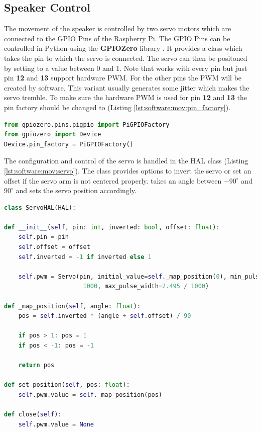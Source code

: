 \subsection{Speaker Control}

The movement of the speaker is controlled by two servo motors which are connected to the GPIO Pins of the Raspberry Pi. The GPIO Pins can be controlled in Python using the \textbf{GPIOZero} library\cite{nuttall_gpio_2021} . It provides a class  which takes the pin to which the servo is connected. The servo can then be positoned by setting  to a value between $0$ and $1$. Note that  works with every pin but just pin \textbf{12} and \textbf{13} support hardware PWM. For the other pins the PWM will be created by software. This variant usually generates some jitter which makes the servo tremble. To make sure the hardware PWM is used for pin \textbf{12} and \textbf{13} the pin factory should be changed to  (Listing \ref{lst:software:mov:pin_factory}).\cite{nuttall_gpio_2021}
%
\begin{mdframed}
\begin{lstlisting}[language=Python, caption=Changing the pin factory, label=lst:software:mov:pin_factory]
from gpiozero.pins.pigpio import PiGPIOFactory
from gpiozero import Device
Device.pin_factory = PiGPIOFactory()
\end{lstlisting}
\end{mdframed}
%
The configuration and control of the servo is handled in the HAL class  (Listing \ref{lst:software:mov:servo}). The class provides options to invert the servo or set an offset if the servo arm is not centered properly.  takes an angle between $-90^\circ$ and $90^\circ$ and sets the servo position accordingly.
%
\begin{mdframed}
\begin{lstlisting}[language=Python, caption=Servo configuration and control, label=lst:software:mov:servo]
class ServoHAL(HAL):

def __init__(self, pin: int, inverted: bool, offset: float):
    self.pin = pin
    self.offset = offset
    self.inverted = -1 if inverted else 1

    self.pwm = Servo(pin, initial_value=self._map_position(0), min_pulse_width=0.615 /
                      1000, max_pulse_width=2.495 / 1000)

def _map_position(self, angle: float):
    pos = self.inverted * (angle + self.offset) / 90

    if pos > 1: pos = 1
    if pos < -1: pos = -1

    return pos

def set_position(self, pos: float):
    self.pwm.value = self._map_position(pos)

def close(self):
    self.pwm.value = None
\end{lstlisting}
\end{mdframed}
